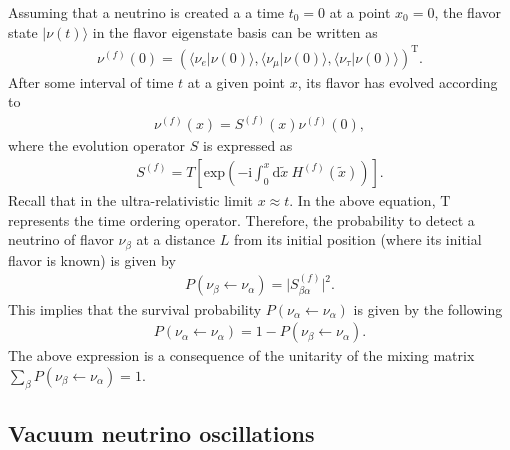 \documentclass[twocolumn,secnumarabic,amssymb, nobibnotes, aps, prd,10pt]{revtex4-1}
\newcommand{\kt}[1]{\vert #1 \rangle}
\newcommand{\bt}[2]{\langle #1 \vert #2 \rangle}
\begin{document}
Assuming that a neutrino is created a a time $t_0 = 0$ at a point $x_0 = 0$, the flavor
state $\kt{\nu (t)}$ in the flavor eigenstate basis can be written as 
\begin{align}
\nu^{(f)} (0) = \left( \bt{\nu_e}{\nu(0)}, \bt{\nu_\mu}{\nu(0)}, \bt{\nu_\tau}{\nu(0)}
\right)^\mathrm{T}.
\end{align}
After some interval of time $t$ at a given point $x$, its flavor has evolved  according to
\begin{align}
\nu^{(f)} (x) = S^{(f)} (x) \nu^{(f)}(0),
\end{align}
where the evolution operator $S$ is expressed as
\begin{align}
S^{(f)} = T \left[ \mathrm{exp} \left( - \mathrm{i} \int_{0}^{x} \mathrm{d}\tilde{x} \:
H^{(f)} (\tilde{x}) \right) \right].
\end{align}
Recall that in the ultra-relativistic limit $x \approx t$. In the above equation, 
$\mathrm{T}$ represents the time ordering operator. Therefore, the probability to detect 
a neutrino of flavor $\nu_\beta$ at a distance $L$ from its initial position (where its 
initial flavor is known) is given by
\begin{align}
P (\nu_\beta \longleftarrow \nu_\alpha) = \vert S^{(f)}_{\beta \alpha} \vert^2.
\label{eq:prob_s}
\end{align}
This implies that the survival probability $P (\nu_\alpha \longleftarrow \nu_\alpha)$
is given by the following
\begin{align}
P (\nu_\alpha \longleftarrow \nu_\alpha) = 1 - P (\nu_\beta \longleftarrow \nu_\alpha).
\end{align}
The above expression is a consequence of the unitarity of the mixing matrix 
$\sum_\beta P (\nu_\beta \longleftarrow \nu_\alpha) = 1$.


\subsection{Vacuum neutrino oscillations}
\label{subsec:2neutrinoOsc}
\end{document}
